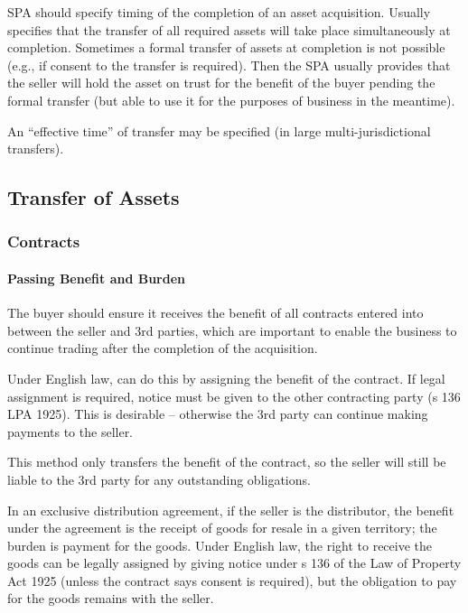 \documentclass[
]{article}
\newenvironment{Shaded}{}{}
\newcommand{\NormalTok}[1]{#1}
\begin{document}
SPA should specify timing of the completion of an asset acquisition.
Usually specifies that the transfer of all required assets will take
place simultaneously at completion. Sometimes a formal transfer of
assets at completion is not possible (e.g., if consent to the transfer
is required). Then the SPA usually provides that the seller will hold
the asset on trust for the benefit of the buyer pending the formal
transfer (but able to use it for the purposes of business in the
meantime).

An ``effective time'' of transfer may be specified (in large
multi-jurisdictional transfers).

\hypertarget{transfer-of-assets}{%
\subsection{Transfer of Assets}\label{transfer-of-assets}}

\hypertarget{contracts}{%
\subsubsection{Contracts}\label{contracts}}

\hypertarget{passing-benefit-and-burden}{%
\paragraph{Passing Benefit and
Burden}\label{passing-benefit-and-burden}}

The buyer should ensure it receives the benefit of all contracts entered
into between the seller and 3rd parties, which are important to enable
the business to continue trading after the completion of the
acquisition.

Under English law, can do this by assigning the benefit of the contract.
If legal assignment is required, notice must be given to the other
contracting party (s 136 LPA 1925). This is desirable -- otherwise the
3rd party can continue making payments to the seller.

\begin{Shaded}
\begin{Highlighting}[]
\NormalTok{This method only transfers the benefit of the contract, so the seller will still be liable to the 3rd party for any outstanding obligations.}
\end{Highlighting}
\end{Shaded}

\begin{Shaded}
\begin{Highlighting}[]
\NormalTok{In an exclusive distribution agreement, if the seller is the distributor, the benefit under the agreement is the receipt of goods for resale in a given territory; the burden is payment for the goods. Under English law, the right to receive the goods can be legally assigned by giving notice under s 136 of the Law of Property Act 1925 (unless the contract says consent is required), but the obligation to pay for the goods remains with the seller.}
\end{Highlighting}
\end{Shaded}
\end{document}
